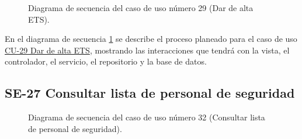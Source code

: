 \begin{figure}[htbp!]
	\begin{center}
		\caption{Diagrama de secuencia del caso de uso número 29 (Dar de alta ETS).}
		\label{fig:Diagrama de secuencia CU-29}
	\end{center}
\end{figure}

En el diagrama de secuencia \ref{fig:Diagrama de secuencia CU-29} se describe el proceso planeado para el caso de uso \hyperlink{CU-29}{CU-29 Dar de alta ETS}, mostrando las interacciones que tendrá con la vista, el controlador, el servicio, el repositorio y la base de datos.

\newpage

\subsection{SE-27 Consultar lista de personal de seguridad}

\begin{figure}[htbp!]
	\begin{center}
		\caption{Diagrama de secuencia del caso de uso número 32 (Consultar lista de personal de seguridad).}
		\label{fig:Diagrama de secuencia CU-32}
	\end{center}
\end{figure}

